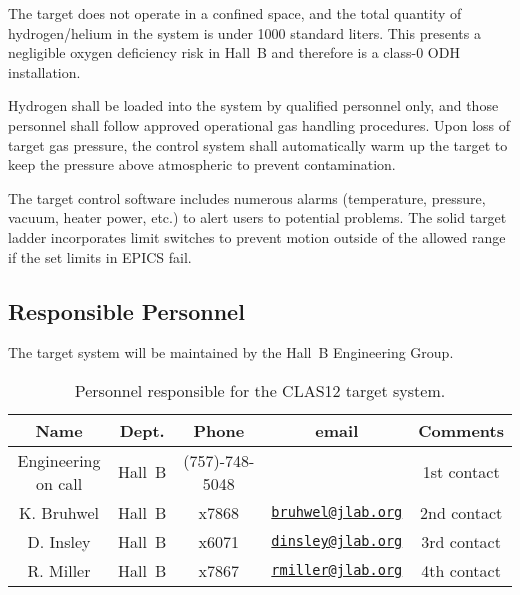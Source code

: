 The target does not operate in a confined space, and the total quantity of hydrogen/helium in 
the system is under 1000 standard liters. This presents a negligible oxygen deficiency risk in 
Hall~B and therefore is a class-0 ODH installation.

Hydrogen shall be loaded into the system by qualified personnel only, and those personnel shall 
follow approved operational gas handling procedures.   Upon loss of target gas pressure, the 
control system shall automatically warm up the target to keep the pressure above atmospheric to 
prevent contamination. 

The target control software includes numerous alarms (temperature, pressure, vacuum, heater 
power, etc.) to alert users to potential problems. The solid target ladder incorporates limit 
switches to prevent motion outside of the allowed range if the set limits in EPICS fail. 

\subsection{Responsible Personnel}

The target system will be maintained by the Hall~B Engineering Group.  

\begin{table}[!htb]
\centering
\begin{tabular}{|c|c|c|c|c|}
\hline
 Name&Dept.&Phone&email&Comments \\ \hline
Engineering on call & Hall~B&(757)-748-5048&& 1st contact  \\ \hline
K. Bruhwel& Hall~B&x7868&\href{mailto:bruhwel@jlab.org}{\nolinkurl{bruhwel@jlab.org}}&2nd contact \\ \hline
D. Insley & Hall~B&x6071&\href{mailto:dinsley@jlab.org}{\nolinkurl{dinsley@jlab.org}}  &3rd contact \\ \hline
R. Miller &Hall~B&x7867&\href{mailto:rmiller@jlab.org}{\nolinkurl{rmiller@jlab.org}} &4th contact \\ \hline
\end{tabular}
\caption{Personnel responsible for the CLAS12 target system.} 
\label{tb:target}
\end{table}
